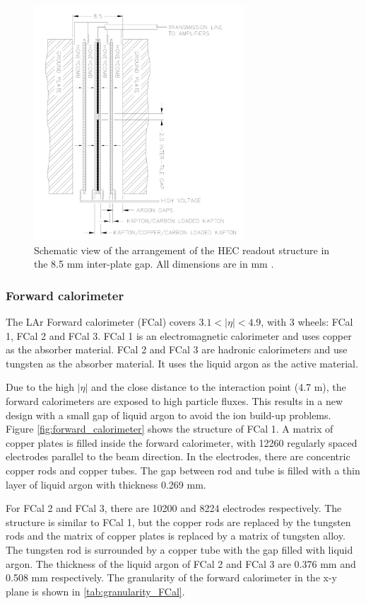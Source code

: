 \begin{figure}
\centering
\includegraphics[width=0.7\textwidth]{data/photo/detector/HEC.png}
\caption{Schematic view of the arrangement of the HEC readout structure in the 8.5 mm inter-plate gap. All dimensions are in mm \cite{ATLAS_doc}.}
\label{fig:HEC}
\end{figure}

\subsubsection{Forward calorimeter}
The LAr Forward calorimeter (FCal) covers $3.1<|\eta|<4.9$, with 3 wheels: FCal 1, FCal 2 and FCal 3.
FCal 1 is an electromagnetic calorimeter and uses copper as the absorber material.
FCal 2 and FCal 3 are hadronic calorimeters and use tungsten as the absorber material.
It uses the liquid argon as the active material.

Due to the high $|\eta|$ and the close distance to the interaction point (4.7 m), the forward calorimeters are exposed to high particle fluxes.
This results in a new design with a small gap of liquid argon to avoid the ion build-up problems.
Figure \ref{fig:forward_calorimeter} shows the structure of FCal 1.
A matrix of copper plates is filled inside the forward calorimeter, with 12260 regularly spaced electrodes parallel to the beam direction.
In the electrodes, there are concentric copper rods and copper tubes.
The gap between rod and tube is filled with a thin layer of liquid argon with thickness 0.269 mm.

For FCal 2 and FCal 3, there are 10200 and 8224 electrodes respectively.
The structure is similar to FCal 1, but the copper rods are replaced by the tungsten rods and the matrix of copper plates is replaced by a matrix of tungsten alloy.
The tungsten rod is surrounded by a copper tube with the gap filled with liquid argon.
The thickness of the liquid argon of FCal 2 and FCal 3 are 0.376 mm and 0.508 mm respectively.
The granularity of the forward calorimeter in the x-y plane is shown in \ref{tab:granularity_FCal}.

